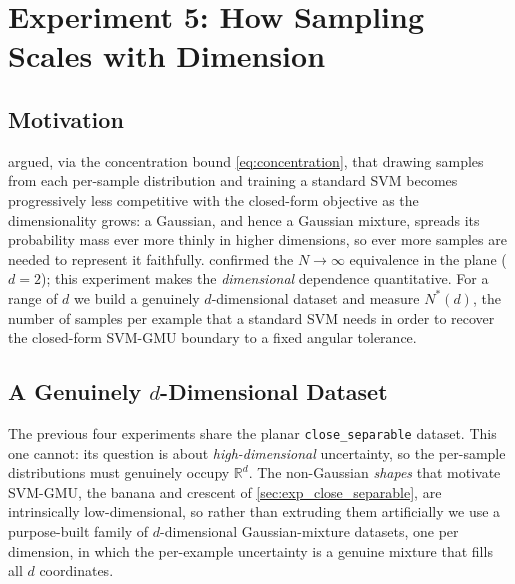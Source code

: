 \documentclass[11pt, letterpaper]{article}
\newcommand{\R}{\mathbb{R}}
\begin{document}
\section{Experiment 5: How Sampling Scales with Dimension}\label{sec:exp_high_dim}

\subsection{Motivation}

 argued, via the concentration bound \cref{eq:concentration}, that drawing samples from each per-sample distribution and training a standard SVM becomes progressively less competitive with the closed-form objective as the dimensionality grows: a Gaussian, and hence a Gaussian mixture, spreads its probability mass ever more thinly in higher dimensions, so ever more samples are needed to represent it faithfully.  confirmed the $N \to \infty$ equivalence in the plane ($d = 2$); this experiment makes the \emph{dimensional} dependence quantitative. For a range of $d$ we build a genuinely $d$-dimensional dataset and measure $N^\ast(d)$, the number of samples per example that a standard SVM needs in order to recover the closed-form SVM-GMU boundary to a fixed angular tolerance.

\subsection{A Genuinely $d$-Dimensional Dataset}\label{sec:exp_high_dim_data}

The previous four experiments share the planar \texttt{close\_separable} dataset. This one cannot: its question is about \emph{high-dimensional} uncertainty, so the per-sample distributions must genuinely occupy $\R^d$. The non-Gaussian \emph{shapes} that motivate SVM-GMU, the banana and crescent of \cref{sec:exp_close_separable}, are intrinsically low-dimensional, so rather than extruding them artificially we use a purpose-built family of $d$-dimensional Gaussian-mixture datasets, one per dimension, in which the per-example uncertainty is a genuine mixture that fills all $d$ coordinates.
\end{document}
